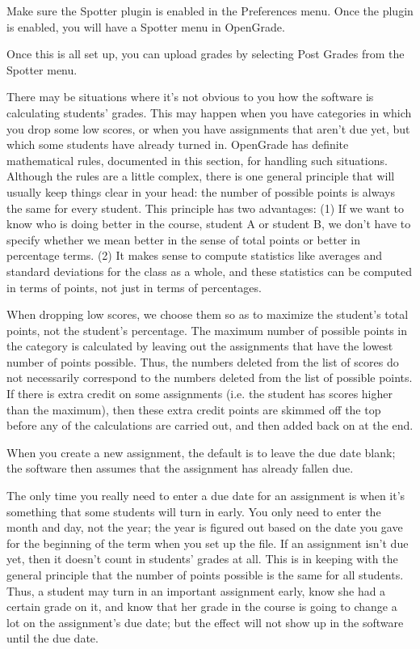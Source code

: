 \documentclass{opengrade_doc}
\begin{document}
Make sure the Spotter plugin is enabled in the Preferences menu.
Once the plugin is enabled, you will have a Spotter menu in OpenGrade.

Once this is all set up, you can upload grades by selecting
Post Grades from the Spotter menu.

\label{howcalc}
There may be situations where it's not obvious to you how the
software is calculating students' grades. This may happen when
you have categories in which you drop some low scores, or
when you have assignments that aren't due yet, but which some
students have already turned in. OpenGrade has definite mathematical
rules, documented in this section,
 for handling such situations. Although the rules are a little
complex, there is one general principle that will usually keep things
clear in your head: the number of possible points is always the same
for every student.
This principle has two advantages: (1) If we want to know who is
doing better in the course, student A or student B, we don't have to specify
whether we mean better in the sense of total points or better in percentage
terms. (2) It makes sense to compute statistics like averages and standard
deviations for the class as a whole, and these statistics can be computed
in terms of points, not just in terms of percentages. 

 When dropping low
scores, we choose them so as to maximize the student's total points,
not the student's percentage. The maximum number of possible points in
the category is calculated by leaving out the assignments that have the
lowest number of points possible. Thus, the numbers deleted from the
list of scores do not necessarily correspond to the numbers deleted
from the list of possible points. If there is extra credit on some
assignments (i.e. the student has scores higher than the maximum),
then these extra credit points are skimmed off the top before any
of the calculations are carried out, and then added back on at the
end.

When you create a new assignment, the default is to leave the due
date blank; the software then assumes that the assignment has already
fallen due.

The only time you really need to enter a due date for an assignment is
when it's something that some students will turn in early. You only need
to enter the month and day, not the year; the year is figured out based
on the date you gave for the beginning of the term when you set up the file.
If an assignment isn't due yet, then it doesn't count in students' grades
at all. This is in keeping with the general principle that the number of points
possible is the same for all students. Thus, a student may turn in an important
assignment early, know she had a certain grade on it, and know that her
grade in the course is going to change a lot on the assignment's due date; but
the effect will not show up in the software until the due date.
\end{document}
